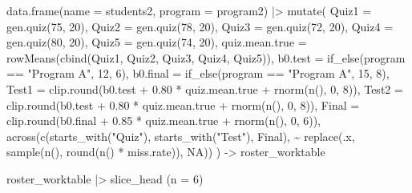 \documentclass[
  letterpaper,
  DIV=11,
  numbers=noendperiod]{scrreprt}
\newenvironment{Shaded}{\begin{snugshade}}{\end{snugshade}}
\newcommand{\AttributeTok}[1]{\textcolor[rgb]{0.40,0.45,0.13}{#1}}
\newcommand{\ConstantTok}[1]{\textcolor[rgb]{0.56,0.35,0.01}{#1}}
\newcommand{\DecValTok}[1]{\textcolor[rgb]{0.68,0.00,0.00}{#1}}
\newcommand{\FloatTok}[1]{\textcolor[rgb]{0.68,0.00,0.00}{#1}}
\newcommand{\FunctionTok}[1]{\textcolor[rgb]{0.28,0.35,0.67}{#1}}
\newcommand{\NormalTok}[1]{\textcolor[rgb]{0.00,0.23,0.31}{#1}}
\newcommand{\OtherTok}[1]{\textcolor[rgb]{0.00,0.23,0.31}{#1}}
\newcommand{\SpecialCharTok}[1]{\textcolor[rgb]{0.37,0.37,0.37}{#1}}
\newcommand{\StringTok}[1]{\textcolor[rgb]{0.13,0.47,0.30}{#1}}
\begin{document}
\begin{Shaded}
\begin{Highlighting}[]
\FunctionTok{data.frame}\NormalTok{(}\AttributeTok{name =}\NormalTok{ students2, }\AttributeTok{program =}\NormalTok{ program2) }\SpecialCharTok{|\textgreater{}}
    \FunctionTok{mutate}\NormalTok{(}
        \AttributeTok{Quiz1 =} \FunctionTok{gen.quiz}\NormalTok{(}\DecValTok{75}\NormalTok{, }\DecValTok{20}\NormalTok{),}
        \AttributeTok{Quiz2 =} \FunctionTok{gen.quiz}\NormalTok{(}\DecValTok{78}\NormalTok{, }\DecValTok{20}\NormalTok{),}
        \AttributeTok{Quiz3 =} \FunctionTok{gen.quiz}\NormalTok{(}\DecValTok{72}\NormalTok{, }\DecValTok{20}\NormalTok{),}
        \AttributeTok{Quiz4 =} \FunctionTok{gen.quiz}\NormalTok{(}\DecValTok{80}\NormalTok{, }\DecValTok{20}\NormalTok{),}
        \AttributeTok{Quiz5 =} \FunctionTok{gen.quiz}\NormalTok{(}\DecValTok{74}\NormalTok{, }\DecValTok{20}\NormalTok{),}
        \AttributeTok{quiz.mean.true =} \FunctionTok{rowMeans}\NormalTok{(}\FunctionTok{cbind}\NormalTok{(Quiz1, Quiz2, Quiz3, Quiz4, Quiz5)),}
        \AttributeTok{b0.test  =} \FunctionTok{if\_else}\NormalTok{(program }\SpecialCharTok{==} \StringTok{"Program A"}\NormalTok{, }\DecValTok{12}\NormalTok{, }\DecValTok{6}\NormalTok{),}
        \AttributeTok{b0.final =} \FunctionTok{if\_else}\NormalTok{(program }\SpecialCharTok{==} \StringTok{"Program A"}\NormalTok{, }\DecValTok{15}\NormalTok{, }\DecValTok{8}\NormalTok{),}
        \AttributeTok{Test1 =} \FunctionTok{clip.round}\NormalTok{(b0.test  }\SpecialCharTok{+} \FloatTok{0.80} \SpecialCharTok{*}\NormalTok{ quiz.mean.true }\SpecialCharTok{+} \FunctionTok{rnorm}\NormalTok{(}\FunctionTok{n}\NormalTok{(), }\DecValTok{0}\NormalTok{, }\DecValTok{8}\NormalTok{)),}
        \AttributeTok{Test2 =} \FunctionTok{clip.round}\NormalTok{(b0.test  }\SpecialCharTok{+} \FloatTok{0.80} \SpecialCharTok{*}\NormalTok{ quiz.mean.true }\SpecialCharTok{+} \FunctionTok{rnorm}\NormalTok{(}\FunctionTok{n}\NormalTok{(), }\DecValTok{0}\NormalTok{, }\DecValTok{8}\NormalTok{)),}
        \AttributeTok{Final =} \FunctionTok{clip.round}\NormalTok{(b0.final }\SpecialCharTok{+} \FloatTok{0.85} \SpecialCharTok{*}\NormalTok{ quiz.mean.true }\SpecialCharTok{+} \FunctionTok{rnorm}\NormalTok{(}\FunctionTok{n}\NormalTok{(), }\DecValTok{0}\NormalTok{, }\DecValTok{6}\NormalTok{)),}
        \FunctionTok{across}\NormalTok{(}\FunctionTok{c}\NormalTok{(}\FunctionTok{starts\_with}\NormalTok{(}\StringTok{"Quiz"}\NormalTok{), }\FunctionTok{starts\_with}\NormalTok{(}\StringTok{"Test"}\NormalTok{), Final),}
               \SpecialCharTok{\textasciitilde{}} \FunctionTok{replace}\NormalTok{(.x, }\FunctionTok{sample}\NormalTok{(}\FunctionTok{n}\NormalTok{(), }\FunctionTok{round}\NormalTok{(}\FunctionTok{n}\NormalTok{() }\SpecialCharTok{*}\NormalTok{ miss.rate)), }\ConstantTok{NA}\NormalTok{))}
\NormalTok{    ) }\OtherTok{{-}\textgreater{}}\NormalTok{ roster\_worktable}

\NormalTok{roster\_worktable }\SpecialCharTok{|\textgreater{}} \FunctionTok{slice\_head}\NormalTok{ (}\AttributeTok{n =} \DecValTok{6}\NormalTok{)}
\end{Highlighting}
\end{Shaded}
\end{document}
